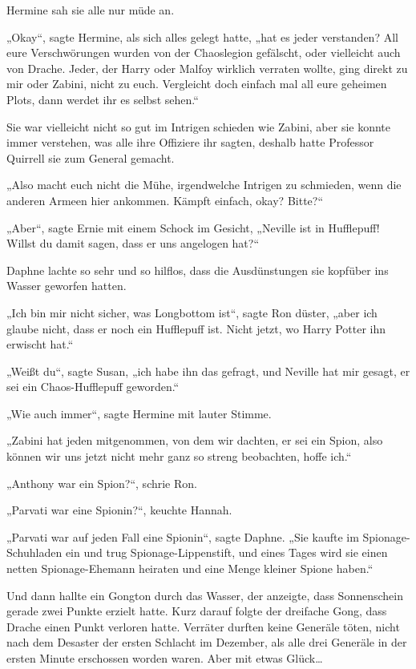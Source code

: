 {Hermine sah sie alle nur müde an.

„Okay“, sagte Hermine, als sich alles gelegt hatte, „hat es jeder verstanden? All eure Verschwörungen wurden von der Chaoslegion gefälscht, oder vielleicht auch von Drache. Jeder, der Harry oder Malfoy wirklich verraten wollte, ging direkt zu mir oder Zabini, nicht zu euch. Vergleicht doch einfach mal all eure geheimen Plots, dann werdet ihr es selbst sehen.“

Sie war vielleicht nicht so gut im Intrigen schieden wie Zabini, aber sie konnte immer verstehen, was alle ihre Offiziere ihr sagten, deshalb hatte Professor Quirrell sie zum General gemacht.

„Also macht euch nicht die Mühe, irgendwelche Intrigen zu schmieden, wenn die anderen Armeen hier ankommen. Kämpft einfach, okay? Bitte?“

„Aber“, sagte Ernie mit einem Schock im Gesicht, „Neville ist in Hufflepuff! Willst du damit sagen, dass er uns angelogen hat?“

Daphne lachte so sehr und so hilflos, dass die Ausdünstungen sie kopfüber ins Wasser geworfen hatten.

„Ich bin mir nicht sicher, was Longbottom ist“, sagte Ron düster, „aber ich glaube nicht, dass er noch ein Hufflepuff ist. Nicht jetzt, wo Harry Potter ihn erwischt hat.“

„Weißt du“, sagte Susan, „ich habe ihn das gefragt, und Neville hat mir gesagt, er sei ein Chaos-Hufflepuff geworden.“

„Wie auch immer“, sagte Hermine mit lauter Stimme.

„Zabini hat jeden mitgenommen, von dem wir dachten, er sei ein Spion, also können wir uns jetzt nicht mehr ganz so streng beobachten, hoffe ich.“

„Anthony war ein Spion?“, schrie Ron.

„Parvati war eine Spionin?“, keuchte Hannah.

„Parvati war auf jeden Fall eine Spionin“, sagte Daphne. „Sie kaufte im Spionage-Schuhladen ein und trug Spionage-Lippenstift, und eines Tages wird sie einen netten Spionage-Ehemann heiraten und eine Menge kleiner Spione haben.“

Und dann hallte ein Gongton durch das Wasser, der anzeigte, dass Sonnenschein gerade zwei Punkte erzielt hatte. Kurz darauf folgte der dreifache Gong, dass Drache einen Punkt verloren hatte. Verräter durften keine Generäle töten, nicht nach dem Desaster der ersten Schlacht im Dezember, als alle drei Generäle in der ersten Minute erschossen worden waren. Aber mit etwas Glück…

}
